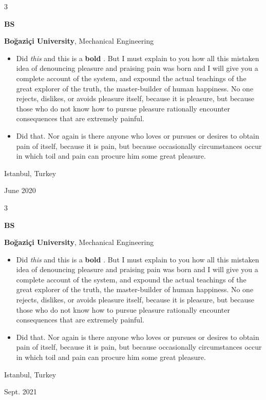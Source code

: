 \documentclass[10pt, letterpaper]{article}
\newenvironment{highlights}{
    \begin{itemize}[
        topsep=0.10 cm,
        parsep=0.10 cm,
        partopsep=0pt,
        itemsep=0pt,
        leftmargin=0.4 cm + 10pt
    ]
}{
    \end{itemize}
} %
\newenvironment{threecolentry}[3][]{
    \onecolentry
    \def\thirdColumn{#3}
    \setcolumnwidth{1 cm, \fill, 4.5 cm}
    \begin{paracol}{3}
    {\raggedright #2} \switchcolumn
}{
    \switchcolumn \raggedleft \thirdColumn
    \end{paracol}
    \endonecolentry
} %
\let\hrefWithoutArrow\href
\renewcommand{\href}[2]{\hrefWithoutArrow{#1}{\mbox{\ifthenelse{\equal{#2}{}}{ }{#2 }\raisebox{.15ex}{\footnotesize \faExternalLink*}}}}
\begin{document}
        \vspace{0.2 cm}

        \begin{threecolentry}{\textbf{BS}}{
            Istanbul, Turkey

        June 2020
        }
            \textbf{Boğaziçi University}, Mechanical Engineering
            \begin{highlights}
                \item Did \textit{this} and this is a \textbf{bold} \href{https://example.com}{link}. But I must explain to you how all this mistaken idea of denouncing pleasure and praising pain was born and I will give you a complete account of the system, and expound the actual teachings of the great explorer of the truth, the master-builder of human happiness. No one rejects, dislikes, or avoids pleasure itself, because it is pleasure, but because those who do not know how to pursue pleasure rationally encounter consequences that are extremely painful.
                \item Did that. Nor again is there anyone who loves or pursues or desires to obtain pain of itself, because it is pain, but because occasionally circumstances occur in which toil and pain can procure him some great pleasure.
            \end{highlights}
        \end{threecolentry}

        \vspace{0.2 cm}

        \begin{threecolentry}{\textbf{BS}}{
            Istanbul, Turkey

        Sept. 2021
        }
            \textbf{Boğaziçi University}, Mechanical Engineering
            \begin{highlights}
                \item Did \textit{this} and this is a \textbf{bold} \href{https://example.com}{link}. But I must explain to you how all this mistaken idea of denouncing pleasure and praising pain was born and I will give you a complete account of the system, and expound the actual teachings of the great explorer of the truth, the master-builder of human happiness. No one rejects, dislikes, or avoids pleasure itself, because it is pleasure, but because those who do not know how to pursue pleasure rationally encounter consequences that are extremely painful.
                \item Did that. Nor again is there anyone who loves or pursues or desires to obtain pain of itself, because it is pain, but because occasionally circumstances occur in which toil and pain can procure him some great pleasure.
            \end{highlights}
        \end{threecolentry}
\end{document}
